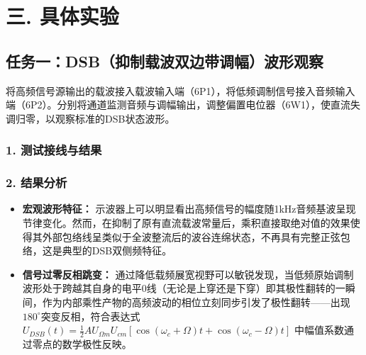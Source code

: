 \documentclass[12pt]{article}
\begin{document}
\section*{三. 具体实验}

\subsection*{任务一：DSB（抑制载波双边带调幅）波形观察}

将高频信号源输出的载波接入载波输入端（6P1），将低频调制信号接入音频输入端（6P2）。分别将通道监测音频与调幅输出，调整偏置电位器（6W1），使直流失调归零，以观察标准的DSB状态波形。

\subsubsection*{1. 测试接线与结果}



\subsubsection*{2. 结果分析}
\begin{itemize}
    \item \textbf{宏观波形特征：} 示波器上可以明显看出高频信号的幅度随1kHz音频基波呈现节律变化。然而，在抑制了原有直流载波常量后，乘积直接取绝对值的效果使得其外部包络线呈类似于全波整流后的波谷连绵状态，不再具有完整正弦包络，这是典型的DSB双侧频特征。
    \item \textbf{信号过零反相跳变：} 通过降低载频展宽视野可以敏锐发现，当低频原始调制波形处于跨越其自身的电平0线（无论是上穿还是下穿）即其极性翻转的一瞬间，作为内部乘性产物的高频波动的相位立刻同步引发了极性翻转——出现$180^\circ$突变反相，符合表达式$U_{DSB}(t) = \frac{1}{2}AU_{\Omega m}U_{cm}[\cos(\omega_c + \Omega)t + \cos(\omega_c - \Omega)t]$ 中幅值系数通过零点的数学极性反映。
\end{itemize}
\end{document}

